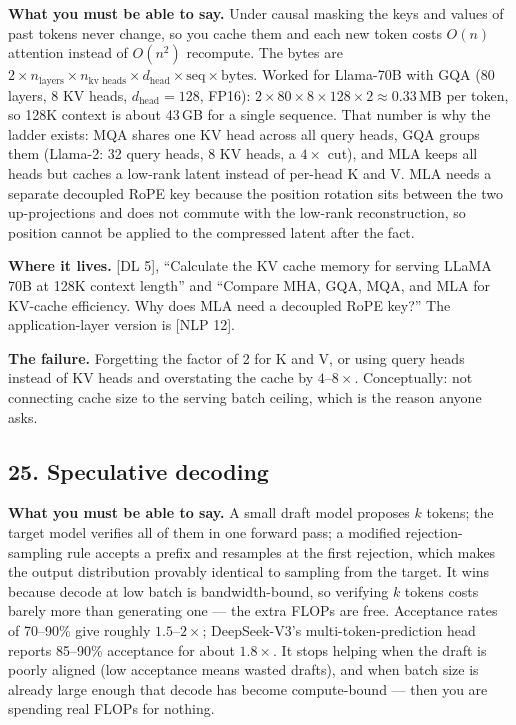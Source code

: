 \textbf{What you must be able to say.} Under causal masking the keys and values of past tokens never change, so you cache them and each new token costs $O(n)$ attention instead of $O(n^2)$ recompute. The bytes are $2 \times n_{\text{layers}} \times n_{\text{kv heads}} \times d_{\text{head}} \times \text{seq} \times \text{bytes}$. Worked for Llama-70B with GQA (80 layers, 8 KV heads, $d_{\text{head}} = 128$, FP16): $2 \times 80 \times 8 \times 128 \times 2 \approx 0.33$\,MB per token, so 128K context is about 43\,GB for a single sequence. That number is why the ladder exists: MQA shares one KV head across all query heads, GQA groups them (Llama-2: 32 query heads, 8 KV heads, a $4\times$ cut), and MLA keeps all heads but caches a low-rank latent instead of per-head K and V. MLA needs a separate decoupled RoPE key because the position rotation sits between the two up-projections and does not commute with the low-rank reconstruction, so position cannot be applied to the compressed latent after the fact.

\textbf{Where it lives.} [DL 5], ``Calculate the KV cache memory for serving LLaMA 70B at 128K context length'' and ``Compare MHA, GQA, MQA, and MLA for KV-cache efficiency. Why does MLA need a decoupled RoPE key?'' The application-layer version is [NLP 12].

\textbf{The failure.} Forgetting the factor of 2 for K and V, or using query heads instead of KV heads and overstating the cache by $4$--$8\times$. Conceptually: not connecting cache size to the serving batch ceiling, which is the reason anyone asks.

\subsection*{25. Speculative decoding}

\textbf{What you must be able to say.} A small draft model proposes $k$ tokens; the target model verifies all of them in one forward pass; a modified rejection-sampling rule accepts a prefix and resamples at the first rejection, which makes the output distribution provably identical to sampling from the target. It wins because decode at low batch is bandwidth-bound, so verifying $k$ tokens costs barely more than generating one --- the extra FLOPs are free. Acceptance rates of 70--90\% give roughly $1.5$--$2\times$; DeepSeek-V3's multi-token-prediction head reports 85--90\% acceptance for about $1.8\times$. It stops helping when the draft is poorly aligned (low acceptance means wasted drafts), and when batch size is already large enough that decode has become compute-bound --- then you are spending real FLOPs for nothing.


